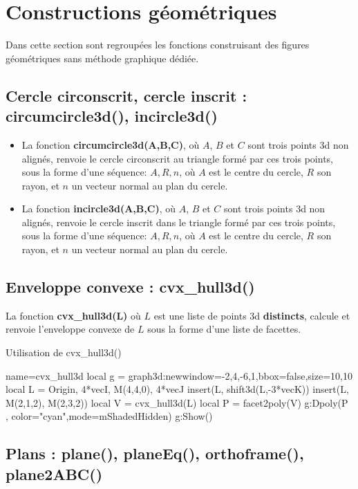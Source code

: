 \section{Constructions géométriques}

Dans cette section sont regroupées les fonctions construisant des figures géométriques sans méthode graphique dédiée.

\subsection{Cercle circonscrit, cercle inscrit : circumcircle3d(), incircle3d()}

\begin{itemize}
    \item La fonction \textbf{circumcircle3d(A,B,C)}, où $A$, $B$ et $C$ sont trois points 3d non alignés, renvoie le cercle circonscrit au triangle formé par ces trois points, sous la forme d'une séquence: $A,R,n$, où $A$ est le centre du cercle, $R$ son rayon, et $n$ un vecteur normal au plan du cercle.
    \item La fonction \textbf{incircle3d(A,B,C)}, où $A$, $B$ et $C$ sont trois points 3d non alignés, renvoie le cercle inscrit dans le triangle formé par ces trois points, sous la forme d'une séquence: $A,R,n$, où $A$ est le centre du cercle, $R$ son rayon, et $n$ un vecteur normal au plan du cercle.    
\end{itemize}

\subsection{Enveloppe convexe : cvx\_hull3d()}

La fonction \textbf{cvx\_hull3d(L)} où $L$ est une liste de points 3d \textbf{distincts}, calcule et renvoie l'enveloppe convexe de $L$ sous la forme d'une liste de facettes.

\begin{demo}{Utilisation de cvx\_hull3d()}
\begin{luadraw}{name=cvx_hull3d}
local g = graph3d:new{window={-2,4,-6,1},bbox=false,size={10,10}}
local L = {Origin, 4*vecI, M(4,4,0), 4*vecJ}
insert(L, shift3d(L,-3*vecK))
insert(L, {M(2,1,2), M(2,3,2)})
local V = cvx_hull3d(L)
local P = facet2poly(V)
g:Dpoly(P , {color="cyan",mode=mShadedHidden})
g:Show()
\end{luadraw}
\end{demo}

\subsection{Plans : plane(), planeEq(), orthoframe(), plane2ABC()}

